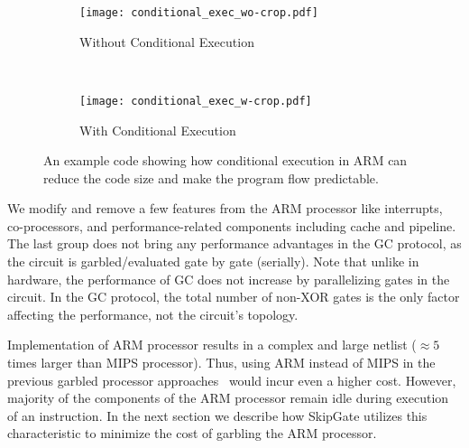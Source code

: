 \begin{figure}[t]
    \centering
    \begin{subfigure}{0.40\columnwidth}
        \centering
        \texttt{[image: conditional\_exec\_wo-crop.pdf]}
        \caption{Without Conditional Execution}
    \end{subfigure}
    ~
    \begin{subfigure}{0.40\columnwidth}
        \centering
        \texttt{[image: conditional\_exec\_w-crop.pdf]}
        \caption{With Conditional Execution}
    \end{subfigure}
    \caption{An example code showing how conditional execution in ARM can reduce the code size and make the program flow predictable.}\label{fig:conditional_exec}
\end{figure}

We modify and remove a few features from the ARM processor like interrupts, co-processors, and performance-related components including cache and pipeline.
The last group does not bring any performance advantages in the GC protocol, as the circuit is garbled/evaluated gate by gate (serially).
Note that unlike in hardware, the performance of GC does not increase by parallelizing gates in the circuit.
In the GC protocol, the total number of non-XOR gates is the only factor affecting the performance, not the circuit's topology.

Implementation of ARM processor results in a complex and large netlist ($\approx 5$ times larger than MIPS processor).
Thus, using ARM instead of MIPS in the previous garbled processor approaches~\cite{wang2016secure, songhori2016garbledcpu} would incur even a higher cost.
However, majority of the components of the ARM processor remain idle during  execution of an instruction.
In the next section we describe how SkipGate utilizes this characteristic to minimize the cost of garbling the ARM processor.

